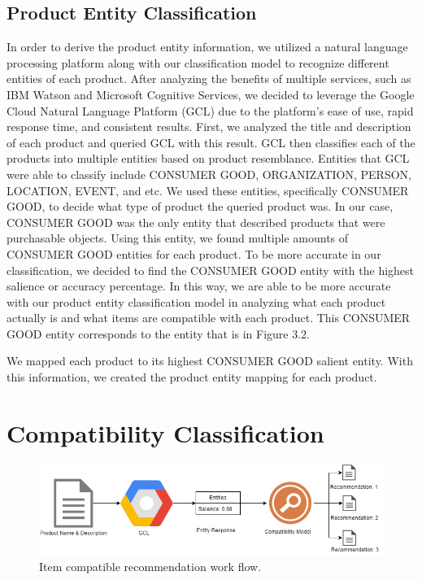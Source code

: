 \subsection{Product Entity Classification}
In order to derive the product entity information, we utilized a natural language processing platform along with our classification model to recognize different entities of each product. After analyzing the benefits of multiple services, such as IBM Watson and Microsoft Cognitive Services, we decided to leverage the Google Cloud Natural Language Platform (GCL) due to the platform's ease of use, rapid response time, and consistent results. First, we analyzed the title and description of each product and queried GCL with this result. GCL then classifies each of the products into multiple entities based on product resemblance. Entities that GCL were able to classify include CONSUMER GOOD, ORGANIZATION, PERSON, LOCATION, EVENT, and etc. We used these entities, specifically CONSUMER GOOD, to decide what type of product the queried product was. In our case, CONSUMER GOOD was the only entity that described products that were purchasable objects. Using this entity, we found multiple amounts of CONSUMER GOOD entities for each product. To be more accurate in our classification, we decided to find the CONSUMER GOOD entity with the highest salience or accuracy percentage. In this way, we are able to be more accurate with our product entity classification model in analyzing what each product actually is and what items are compatible with each product. This CONSUMER GOOD entity corresponds to the entity that is in Figure 3.2.

We mapped each product to its highest CONSUMER GOOD salient entity. With this information, we created the product entity mapping for each product. 

\section{Compatibility Classification}
\begin{figure}[h!]
	\includegraphics[scale=0.5]{data/Diagram.png}
	\caption{Item compatible recommendation work flow.}
\end{figure}


